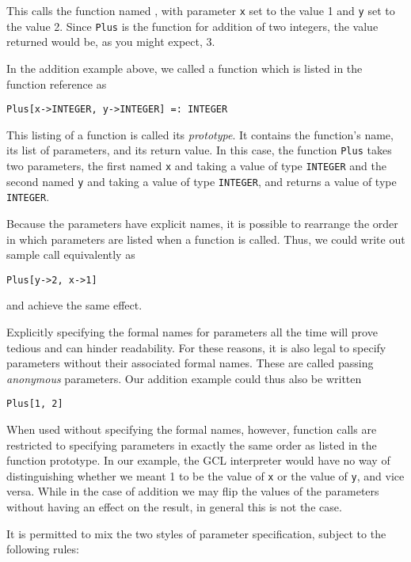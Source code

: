 This calls the function named , with parameter \verb+x+ set
to the value 1 and \verb+y+ set to the value 2.  Since {\tt Plus} is
the function for addition of two integers, the value returned would
be, as you might expect, 3.

In the addition example above, we called a function which is listed in
the function reference as

\begin{verbatim}
Plus[x->INTEGER, y->INTEGER] =: INTEGER
\end{verbatim}

\noindent This listing of a function is called its {\it prototype}.  
It contains the function's name, its list of parameters, and its return
value.  In this case, the function {\tt Plus} takes two parameters, the
first named \verb+x+ and taking a value of type {\tt INTEGER} and the
second named \verb+y+ and taking a value of type {\tt INTEGER}, and
returns a value of type {\tt INTEGER}.

Because the parameters have explicit names, it is possible to rearrange
the order in which parameters are listed when a function is called.
Thus, we could write out sample call equivalently as

\begin{verbatim}
Plus[y->2, x->1]
\end{verbatim}

\noindent and achieve the same effect.

Explicitly specifying the formal names for parameters all the time
will prove tedious and can hinder readability.  For these reasons, it is
also legal to specify parameters without their associated formal names.
These are called passing {\it anonymous} parameters.  Our addition
example could thus also be written

\begin{verbatim}
Plus[1, 2]
\end{verbatim}

When used without specifying the formal names, however, function
calls are restricted to specifying parameters in exactly the same
order as listed in the function prototype.  In our example, the GCL
interpreter would have no way of distinguishing whether we meant 1 to
be the value of \verb+x+ or the value of \verb+y+, and vice versa.
While in the case of addition we may flip the values of the parameters
without having an effect on the result, in general this is not the
case.

It is permitted to mix the two styles of parameter specification,
subject to the following rules:

